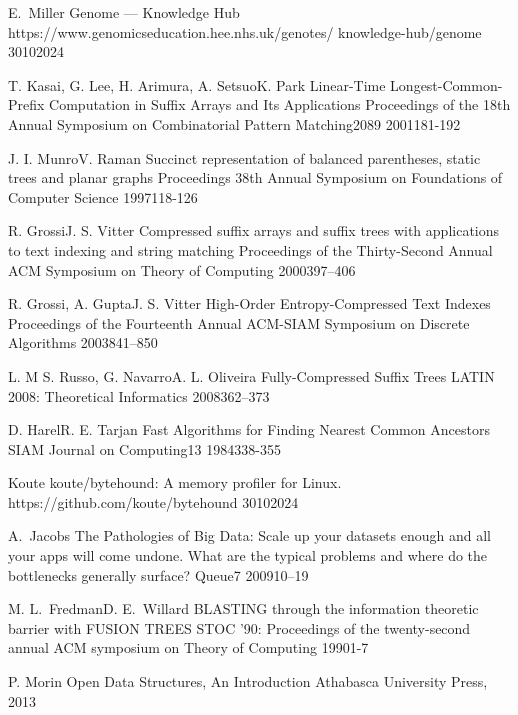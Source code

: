 \spletniVirZAvtorjem
    {E.~Miller}
    {Genome — Knowledge Hub}
    {\newline https://www.genomicseducation.hee.nhs.uk/genotes/ knowledge-hub/genome}
    {30}{10}{2024}

\clanekVRevijiVecAvtorjev
    {T. Kasai, G. Lee, H. Arimura, A. Setsuo}{K. Park}
    {Linear-Time Longest-Common-Prefix Computation in Suffix Arrays and Its Applications}
    {Proceedings of the 18th Annual Symposium on Combinatorial Pattern Matching}{2089}
    {2001}{181-192}

\clanekVRevijiVecAvtorjev
    {J. I. Munro}{V. Raman}
    {Succinct representation of balanced parentheses, static trees and planar graphs}
    {Proceedings 38th Annual Symposium on Foundations of Computer Science}{}
    {1997}{118-126}

\clanekVRevijiVecAvtorjev
    {R. Grossi}{J. S. Vitter}
    {Compressed suffix arrays and suffix trees with applications to text indexing and string matching }
    {Proceedings of the Thirty-Second Annual ACM Symposium on Theory of Computing}{}
    {2000}{397–406}

\clanekVRevijiVecAvtorjev
    {R. Grossi, A. Gupta}{J. S. Vitter}
    {High-Order Entropy-Compressed Text Indexes }
    {Proceedings of the Fourteenth Annual ACM-SIAM Symposium on Discrete Algorithms}{}
    {2003}{841–850}

\clanekVRevijiVecAvtorjev
    {L. M S. Russo, G. Navarro}{A. L. Oliveira}
    {Fully-Compressed Suffix Trees}
    {LATIN 2008: Theoretical Informatics}{}
    {2008}{362--373}

\clanekVRevijiVecAvtorjev
    {D. Harel}{R. E. Tarjan}
    {Fast Algorithms for Finding Nearest Common Ancestors}
    {SIAM Journal on Computing}{13}
    {1984}{338-355}

\spletniVirZAvtorjem
    {Koute}
    {koute/bytehound: A memory profiler for Linux.}
    {https://github.com/koute/bytehound}
    {30}{10}{2024}

\clanekVRevijiEnAvtor
    {A.~Jacobs}
    {The Pathologies of Big Data: Scale up your datasets enough and all your apps will come undone. What are the typical problems and where do the bottlenecks generally surface?}
    {Queue}{7}
    {2009}{10--19}
    
\konferencniClanekVecAvtorjev
    {M. L.~Fredman}{D. E.~Willard}
    {BLASTING through the information theoretic barrier with FUSION TREES}
    {STOC '90: Proceedings of the twenty-second annual ACM symposium on Theory of Computing}
    {1990}{1-7}

\knjigaEnAvtor
    {P. Morin}
    {Open Data Structures, An Introduction}
    {Athabasca University Press, 2013}

